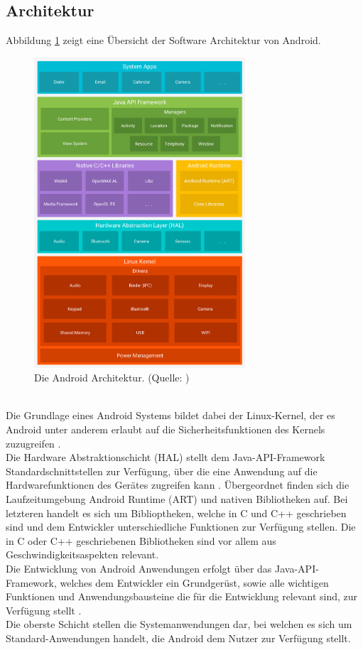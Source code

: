 \subsection{Architektur}
Abbildung \ref{fig:android-stack} zeigt eine Übersicht der Software Architektur von Android. 
\begin{figure}[h!]
\centering
\includegraphics[width=0.7\textwidth]{Abbildungen/android-stack.png}
\caption[Android: Architektur]{Die Android Architektur. (Quelle: \citet{android:architecture})}
\label{fig:android-stack}
\end{figure}\\
Die Grundlage eines Android Systems bildet dabei der Linux-Kernel, der es Android unter anderem erlaubt auf die Sicherheitsfunktionen des Kernels zuzugreifen \citep{android:architecture}. \\
Die Hardware Abstraktionschicht (HAL) stellt dem Java-API-Framework Standardschnittstellen zur Verfügung, über die eine Anwendung auf die Hardwarefunktionen des Gerätes zugreifen kann \citep{android:architecture}.
Übergeordnet finden sich die Laufzeitumgebung Android Runtime (ART) und nativen Bibliotheken auf. Bei letzteren handelt es sich um Biblioptheken, welche in C und C++ geschrieben sind \citep{android:architecture} und dem Entwickler unterschiedliche Funktionen zur Verfügung stellen. Die in C oder C++ geschriebenen Bibliotheken sind vor allem aus Geschwindigkeitsaspekten relevant. \\
Die Entwicklung von Android Anwendungen erfolgt über das Java-API-Framework, welches dem Entwickler ein Grundgerüst, sowie alle wichtigen Funktionen und Anwendungsbausteine die für die Entwicklung relevant sind, zur Verfügung stellt \citep{android:architecture}.\\
Die oberste Schicht stellen die Systemanwendungen dar, bei welchen es sich um Standard-Anwendungen handelt, die Android dem Nutzer zur Verfügung stellt.

